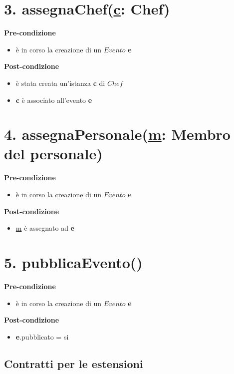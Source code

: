 \documentclass[12pt]{extarticle}
\begin{document}
 

\section*{3. assegnaChef(\underline{c}: Chef)}

\textbf{Pre-condizione}
\begin{itemize}
  \item è in corso la creazione di un $Evento$ \textbf{e}
\end{itemize}
\textbf{Post-condizione}
\begin{itemize}
  \item è stata creata un'istanza \textbf{c} di  $Chef$
  \item \textbf{c} è associato all'evento \textbf{e}
\end{itemize}

 

\section*{4. assegnaPersonale(\underline{m}: Membro del personale)}

\textbf{Pre-condizione}
\begin{itemize}
  \item è in corso la creazione di un $Evento$ \textbf{e}
\end{itemize}
\textbf{Post-condizione}
\begin{itemize}
  \item \underline{m} è assegnato ad \textbf{e}
\end{itemize} 


\section*{5. pubblicaEvento()}
\textbf{Pre-condizione}
\begin{itemize}
  \item è in corso la creazione di un $Evento$ \textbf{e}
\end{itemize}
\textbf{Post-condizione}
\begin{itemize}
    \item \textbf{e}.pubblicato = si
\end{itemize}

\newpage
\begin{center}
  \section*{Contratti per le estensioni}
\end{center}
\end{document}
